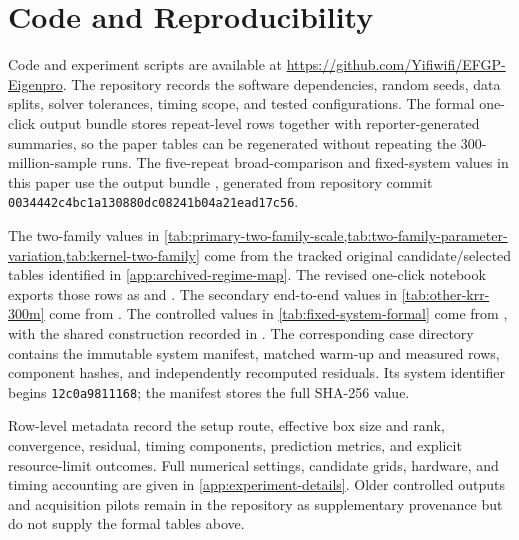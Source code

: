 \section{Code and Reproducibility}
\label{sec:reproducibility}

Code and experiment scripts are available at
\url{https://github.com/Yifiwifi/EFGP-Eigenpro}.  The repository records the
software dependencies, random seeds, data splits, solver tolerances, timing
scope, and tested configurations.  The formal one-click output bundle stores
repeat-level rows together with reporter-generated summaries, so the paper
tables can be regenerated without repeating the 300-million-sample runs.
The five-repeat broad-comparison and fixed-system values in this paper use the output bundle
, generated from repository commit
\texttt{0034442c4bc1a130880dc08241b04a21ead17c56}.

\begin{sloppypar}
The two-family values in
\cref{tab:primary-two-family-scale,tab:two-family-parameter-variation,tab:kernel-two-family}
come from the
tracked original candidate/selected tables identified in
\cref{app:archived-regime-map}.  The revised one-click notebook exports those
rows as  and
.  The secondary end-to-end values in
\cref{tab:other-krr-300m} come from
.  The controlled values
in \cref{tab:fixed-system-formal} come from
, with the shared
construction recorded in
.  The corresponding
case directory contains the immutable system manifest, matched warm-up and
measured rows, component hashes, and independently recomputed residuals.  Its
system identifier begins \texttt{12c0a9811168}; the manifest stores the full
SHA-256 value.
\end{sloppypar}

Row-level metadata record the setup route, effective box size and rank,
convergence, residual, timing components, prediction metrics, and explicit
resource-limit outcomes.  Full numerical settings, candidate grids, hardware,
and timing accounting are given in \cref{app:experiment-details}.  Older
controlled outputs and acquisition pilots remain in the repository as
supplementary provenance but do not supply the formal tables above.
